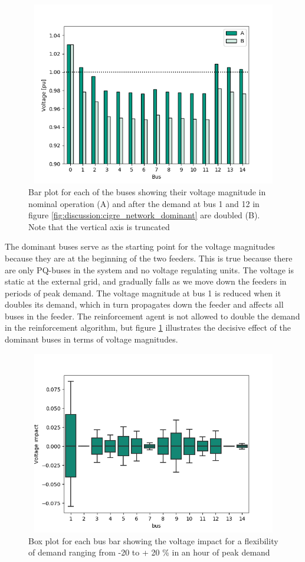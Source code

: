 \documentclass[class=book, crop=false, 11pt]{standalone}
\begin{document}
\begin{figure}[ht!]
    \center
\includegraphics[height=8cm, width=12cm]{figures/double_large_load.png}
    \caption[size = 9]{Bar plot for each of the buses showing their voltage magnitude in nominal operation (A) and after the demand at bus 1 and 12 in figure \ref{fig:discussion:cigre_network_dominant} are doubled (B). Note that the vertical axis is truncated}
    \label{fig:discussion:double_large_load}
\end{figure}
The dominant buses serve as the starting point for the voltage magnitudes because they are at the beginning of the two feeders. This is true because there are only PQ-buses in the system and no voltage regulating units. The voltage is static at the external grid, and gradually falls as we move down the feeders in periods of peak demand. The voltage magnitude at bus 1 is reduced when it doubles its demand, which in turn propagates down the feeder and affects all buses in the feeder. The reinforcement agent is not allowed to double the demand in the reinforcement algorithm, but figure \ref{fig:discussion:double_large_load} illustrates the decisive effect of the dominant buses in terms of voltage magnitudes.

\begin{figure}[hb!]
    \center
\includegraphics[height=8cm, width=12cm]{figures/voltage_impact.png}
    \caption[size = 9]{Box plot for each bus bar showing the voltage impact for a flexibility of demand ranging from -20 to + 20 \% in an hour of peak demand}
    \label{fig:discussion:voltage_impact}
\end{figure}
\end{document}
